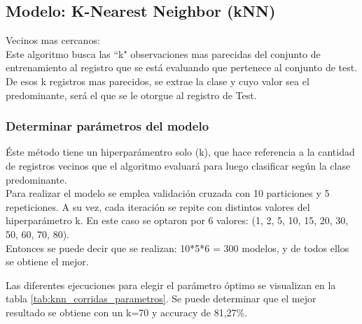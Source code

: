 \subsection{Modelo: K-Nearest Neighbor (kNN)}
Vecinos mas cercanos:\\
Este algoritmo busca las ``k" observaciones mas parecidas del conjunto de entrenamiento al registro que se está evaluando que pertenece al conjunto de test. De esos k registros mas parecidos, se extrae la clase y cuyo valor sea el predominante, será el que se le otorgue al registro de Test.


\subsubsection{Determinar parámetros del modelo}
Éste método tiene un hiperparámentro solo (k), que hace referencia a la cantidad de registros vecinos que el algoritmo evaluará para luego clasificar según la clase predominante.\\

Para realizar el modelo se emplea validación cruzada con 10 particiones y 5 repeticiones. A su vez, cada iteración se repite con distintos valores del hiperparámetro k. En este caso se optaron por 6 valores: (1, 2, 5, 10, 15, 20, 30, 50, 60, 70, 80).\\
Entonces se puede decir que se realizan: 10*5*6 = 300 modelos, y de todos ellos se obtiene el mejor.

Las diferentes ejecuciones para elegir el parámetro óptimo se visualizan en la tabla \ref{tab:knn_corridas_parametros}.
Se puede determinar que el mejor resultado se obtiene con un k=70 y accuracy de 81,27\%.


